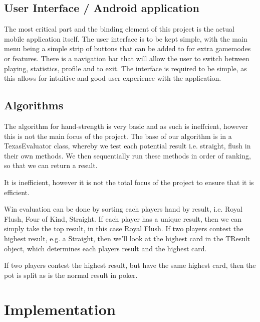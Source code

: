 \documentclass[11pt]{article}
\begin{document}
\subsection{User Interface / Android application}

The most critical part and the binding element of this project is the actual mobile application itself. The user interface is to be kept simple, with the main menu being a simple strip of buttons that can be added to for extra gamemodes or features. There is a navigation bar that will allow the user to switch between playing, statistics, profile and to exit. 
The interface is required to be simple, as this allows for intuitive and good user experience with the application.









\subsection{Algorithms}

The algorithm for hand-strength is very basic and as such is ineffcient, however this is not the main focus of the project. The base of our algorithm is in a TexasEvaluator class, whereby we test each potential result i.e. straight, flush in their own methods. We then sequentially run these methods in order of ranking, so that we can return a result. 

It is inefficient, however it is not the total focus of the project to ensure that it is efficient. 


Win evaluation can be done by sorting each players hand by result, i.e. Royal Flush, Four of Kind, Straight. If each player has a unique result, then we can simply take the top result, in this case Royal Flush. If two players contest the highest result, e.g. a Straight, then we'll look at the highest card in the TResult object, which determines each players result and the highest card. 

If two players contest the highest result, but have the same highest card, then the pot is split as is the normal result in poker. 


\section{Implementation}
\end{document}

